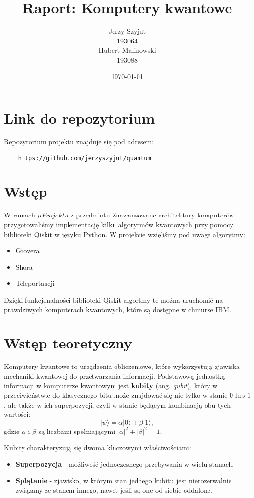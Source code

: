 \documentclass[a4paper,12pt]{article}
\title{Raport: Komputery kwantowe}
\author{Jerzy Szyjut \\
        193064 \\
        Hubert Malinowski \\
        193088}
\date{\today}
\begin{document}
\maketitle

\section{Link do repozytorium}
Repozytorium projektu znajduje się pod adresem:
\begin{verbatim}
    https://github.com/jerzyszyjut/quantum
\end{verbatim}

\section{Wstęp}
W ramach $\mu Projektu$ z przedmiotu Zaawansowane architektury komputerów 
przygotowaliśmy implementację kilku algorytmów kwantowych przy pomocy biblioteki
Qiskit w języku Python. W projekcie wzięliśmy pod uwagę algorytmy:
\begin{itemize}
    \item Grovera
    \item Shora
    \item Teleportaacji
\end{itemize}
Dzięki funkcjonalności biblioteki Qiskit algortmy te można uruchomić
na prawdziwych komputerach kwantowych, które są dostępne w chmurze
IBM.

\section{Wstęp teoretyczny}
Komputery kwantowe to urządzenia obliczeniowe, które wykorzystują 
zjawiska mechaniki kwantowej do przetwarzania informacji. Podstawową 
jednostką informacji w komputerze kwantowym jest \textbf{kubity} 
(ang. \emph{qubit}), który w przeciwieństwie do klasycznego bitu może 
znajdować się nie tylko w stanie $0$ lub $1$, ale także w ich superpozycji, 
czyli w stanie będącym kombinacją obu tych wartości:
\[
|\psi\rangle = \alpha|0\rangle + \beta|1\rangle,
\]
gdzie $\alpha$ i $\beta$ są liczbami spełniającymi $|\alpha|^2 + |\beta|^2 = 1$.

\vspace{0.5cm}

Kubity charakteryzują się dwoma kluczowymi właściwościami:
\begin{itemize}
    \item \textbf{Superpozycja} - możliwość jednoczesnego przebywania w wielu 
    stanach.
    \item \textbf{Splątanie} - zjawisko, w którym stan jednego kubitu jest 
    nierozerwalnie związany ze stanem innego, nawet jeśli są one od siebie 
    oddalone.
\end{itemize}
\end{document}
